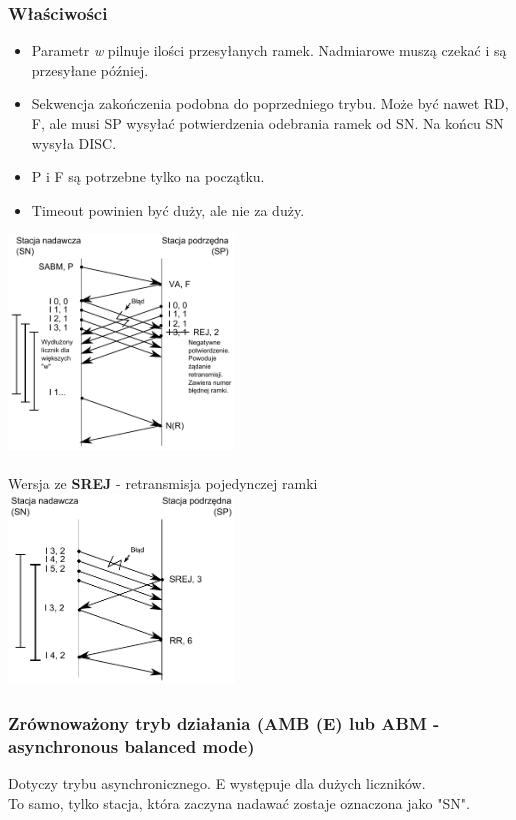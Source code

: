 			\subsubsection{Właściwości}
				\begin{itemize}
					\item Parametr \emph{w} pilnuje ilości przesyłanych ramek. Nadmiarowe muszą czekać i są przesyłane później.
					\item Sekwencja zakończenia podobna do poprzedniego trybu. Może być nawet RD, F, ale musi SP wysyłać potwierdzenia odebrania ramek od SN. Na końcu SN wysyła DISC.
					\item P i F są potrzebne tylko na początku.
					\item Timeout powinien być duży, ale nie za duży.
				\end{itemize}
				\includegraphics[width=6cm]{./images/image17.pdf}\\\\
				Wersja ze \textbf{SREJ} - retransmisja pojedynczej ramki\\
				\includegraphics[width=6cm]{./images/image18.pdf}
			\subsubsection{Zrównoważony tryb działania (AMB (E) lub ABM - asynchronous balanced mode)}
				Dotyczy trybu asynchronicznego. E występuje dla dużych liczników.\\
				To samo, tylko stacja, która zaczyna nadawać zostaje oznaczona jako "SN".
